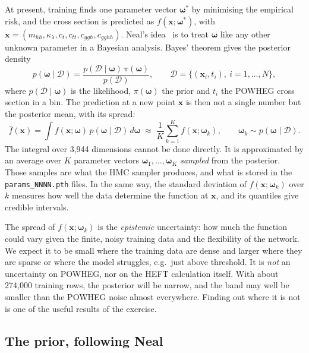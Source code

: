 \documentclass[11pt]{article}
\newcommand{\file}[1]{\nolinkurl{#1}}
\newcommand{\mhh}{m_{hh}}
\newcommand{\bw}{\boldsymbol{\omega}}
\newcommand{\bx}{\boldsymbol{x}}
\newcommand{\data}{\mathcal{D}}
\begin{document}
At present, training finds one parameter vector $\bw^*$ by minimising the empirical
risk, and the cross section is predicted as $f(\bx; \bw^*)$, with
$\bx = (\mhh, \kappa_\lambda, c_t, c_{tt}, c_{ggh}, c_{gghh})$. Neal's
idea~\cite{neal1996} is to treat $\bw$ like any other unknown parameter in a
Bayesian analysis. Bayes' theorem gives the posterior density
\begin{equation}
  p(\bw \mid \data) = \frac{p(\data \mid \bw)\, \pi(\bw)}{p(\data)},
  \qquad \data = \{(\bx_i, t_i),\ i = 1,\ldots,N\},
  \label{eq:bayes}
\end{equation}
where $p(\data \mid \bw)$ is the likelihood, $\pi(\bw)$ the prior and $t_i$ the
POWHEG cross section in a bin. The prediction at a new point $\bx$ is then not a
single number but the posterior mean, with its spread:
\begin{equation}
  \bar f(\bx) = \int f(\bx; \bw)\, p(\bw \mid \data)\, d\bw
  \;\approx\; \frac{1}{K} \sum_{k=1}^{K} f(\bx; \bw_k),
  \qquad \bw_k \sim p(\bw \mid \data).
  \label{eq:mean}
\end{equation}
The integral over 3,944 dimensions cannot be done directly. It is approximated by
an average over $K$ parameter vectors $\bw_1, \ldots, \bw_K$ \emph{sampled} from
the posterior. Those samples are what the HMC sampler produces, and what is stored
in the \file{params_NNNN.pth} files. In the same way, the standard deviation of
$f(\bx; \bw_k)$ over $k$ measures how well the data determine the function at
$\bx$, and its quantiles give credible intervals.

\begin{aside}
The spread of $f(\bx; \bw_k)$ is the \emph{epistemic} uncertainty: how much the
function could vary given the finite, noisy training data and the flexibility of
the network. We expect it to be small where the training data are dense and larger
where they are sparse or where the model struggles, e.g.\ just above threshold.
It is \emph{not} an uncertainty on POWHEG, nor on the HEFT calculation itself.
With about 274,000 training rows, the posterior will be narrow, and the band may
well be smaller than the POWHEG noise almost everywhere. Finding out where it is
not is one of the useful results of the exercise.
\end{aside}

\subsection{The prior, following Neal}
\label{sec:prior}
\end{document}
